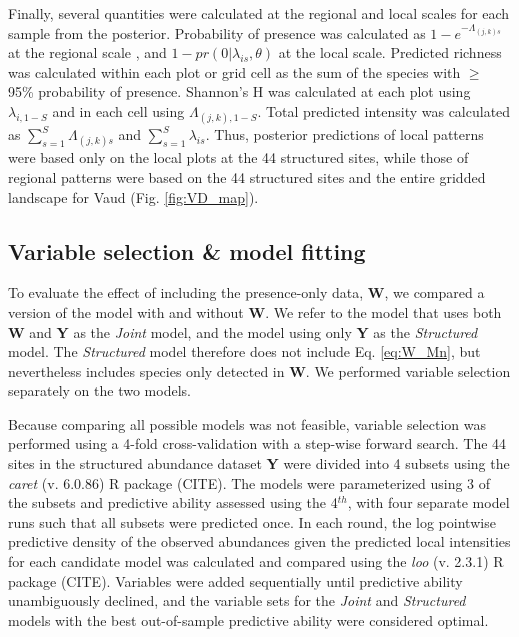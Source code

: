 \documentclass[preprint,review,times,12pt]{elsarticle}
\begin{document}
Finally, several quantities were calculated at the regional and local scales for each sample from the posterior. Probability of presence was calculated as $1 - e^{-\Lambda_{(j,k)s}}$ at the regional scale  \citep{Hefley2016}, and $1 - pr(0 | \lambda_{is}, \theta)$ at the local scale. Predicted richness was calculated within each plot or grid cell as the sum of the species with $\geq$ 95\% probability of presence. Shannon's H was calculated at each plot using $\lambda_{i,1-S}$ and in each cell using $\Lambda_{(j,k),1-S}$. Total predicted intensity was calculated as $\sum_{s=1}^{S}\Lambda_{(j,k)s}$ and $\sum_{s=1}^{S}\lambda_{is}$. Thus, posterior predictions of local patterns were based only on the local plots at the 44 structured sites, while those of regional patterns were based on the 44 structured sites and the entire gridded landscape for Vaud (Fig. \ref{fig:VD_map}). 


\subsection{Variable selection \& model fitting}
To evaluate the effect of including the presence-only data, \textbf{W}, we compared a version of the model with and without \textbf{W}. We refer to the model that uses both \textbf{W} and \textbf{Y} as the \emph{Joint} model, and the model using only \textbf{Y} as the \emph{Structured} model. The \emph{Structured} model therefore does not include Eq. \ref{eq:W_Mn}, but nevertheless includes species only detected in \textbf{W}. We performed variable selection separately on the two models.

Because comparing all possible models was not feasible, variable selection was performed using a 4-fold cross-validation with a step-wise forward search. The 44 sites in the structured abundance dataset \textbf{Y} were divided into 4 subsets using the \emph{caret} (v. 6.0.86) R package (CITE). The models were parameterized using 3 of the subsets and predictive ability assessed using the 4$^{th}$, with four separate model runs such that all subsets were predicted once. In each round, the log pointwise predictive density of the observed abundances given the predicted local intensities for each candidate model was calculated and compared using the \emph{loo} (v. 2.3.1) R package (CITE). Variables were added sequentially until predictive ability unambiguously declined, and the variable sets for the \emph{Joint} and \emph{Structured} models with the best out-of-sample predictive ability were considered optimal.
\end{document}

